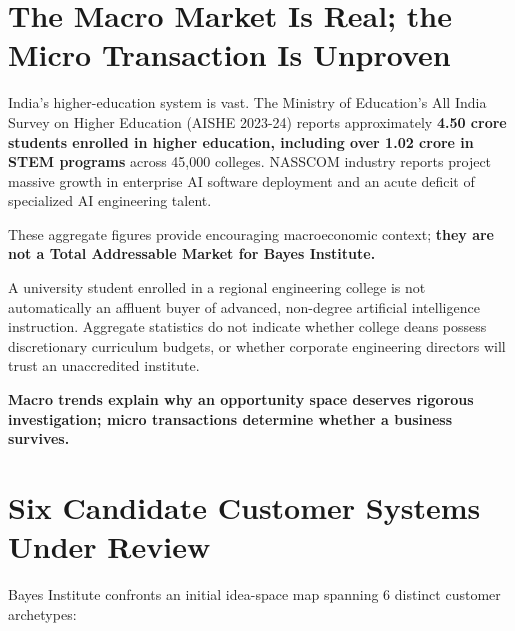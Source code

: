 \section{The Macro Market Is Real; the Micro Transaction Is Unproven}

India's higher-education system is vast. The Ministry of Education's All India Survey on Higher Education (AISHE 2023-24) reports approximately \textbf{4.50 crore students enrolled in higher education, including over 1.02 crore in STEM programs} across 45,000 colleges. NASSCOM industry reports project massive growth in enterprise AI software deployment and an acute deficit of specialized AI engineering talent.

These aggregate figures provide encouraging macroeconomic context; \textbf{they are not a Total Addressable Market for Bayes Institute.}

A university student enrolled in a regional engineering college is not automatically an affluent buyer of advanced, non-degree artificial intelligence instruction. Aggregate statistics do not indicate whether college deans possess discretionary curriculum budgets, or whether corporate engineering directors will trust an unaccredited institute.

\textbf{Macro trends explain why an opportunity space deserves rigorous investigation; micro transactions determine whether a business survives.}

\section{Six Candidate Customer Systems Under Review}

Bayes Institute confronts an initial idea-space map spanning 6 distinct customer archetypes:

